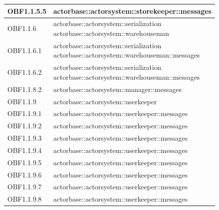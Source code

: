 \documentclass{scalatekids-article}
\begin{document}
\begin{longtable}[H]{|p{3.5cm}|p{7.5cm}|}
  \hline
  OBF1.1.5.5 & \multiLineCell[t]{actorbase::actorsystem::storekeeper::messages\\}\\
  \hline
  OBF1.1.6 & \multiLineCell[t]{actorbase::actorsystem::serialization\\actorbase::actorsystem::warehouseman\\}\\
  \hline
  OBF1.1.6.1 & \multiLineCell[t]{actorbase::actorsystem::serialization\\actorbase::actorsystem::warehouseman::messages\\}\\
  \hline
  OBF1.1.6.2 & \multiLineCell[t]{actorbase::actorsystem::serialization\\actorbase::actorsystem::warehouseman::messages\\}\\
  \hline
  OBF1.1.8.2 & \multiLineCell[t]{actorbase::actorsystem::manager::messages\\}\\
  \hline
  OBF1.1.9 & \multiLineCell[t]{actorbase::actorsystem::userkeeper\\}\\
  \hline
  OBF1.1.9.1 & \multiLineCell[t]{actorbase::actorsystem::userkeeper::messages\\}\\
  \hline
  OBF1.1.9.2 & \multiLineCell[t]{actorbase::actorsystem::userkeeper::messages\\}\\
  \hline
  OBF1.1.9.3 & \multiLineCell[t]{actorbase::actorsystem::userkeeper::messages\\}\\
  \hline
  OBF1.1.9.4 & \multiLineCell[t]{actorbase::actorsystem::userkeeper::messages\\}\\
  \hline
  OBF1.1.9.5 & \multiLineCell[t]{actorbase::actorsystem::userkeeper::messages\\}\\
  \hline
  OBF1.1.9.6 & \multiLineCell[t]{actorbase::actorsystem::userkeeper::messages\\}\\
  \hline
  OBF1.1.9.7 & \multiLineCell[t]{actorbase::actorsystem::userkeeper::messages\\}\\
  \hline
  OBF1.1.9.8 & \multiLineCell[t]{actorbase::actorsystem::userkeeper::messages\\}\\

\end{longtable}
\end{document}
